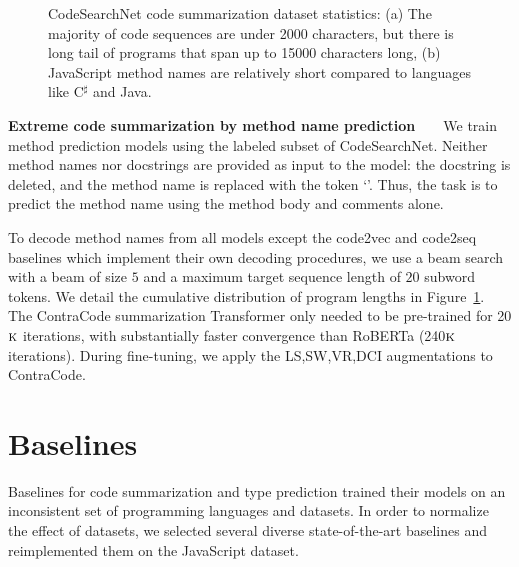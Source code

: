 \documentclass[11pt]{article}
\newcommand{\thou}[0]{$\textsc{k}$}
\newcommand{\ours}[0]{ContraCode}
\begin{document}
\begin{figure}[t!]
    \centering
    \qquad
    \caption{CodeSearchNet code summarization dataset statistics: (a) The majority of code sequences are under 2000 characters, but there is long tail of programs that span up to 15000 characters long, (b) JavaScript method names are relatively short compared to languages like C$^\sharp$ and Java.}
    \label{fig:dataset_statistics_identifier}
\end{figure} 
\textbf{Extreme code summarization by method name prediction}~~~~We train method prediction models using the labeled subset of CodeSearchNet. Neither method names nor docstrings are provided as input to the model: the docstring is deleted, and the method name is replaced with the token `'. Thus, the task is to predict the method name using the method body and comments alone.

To decode method names from all models except the code2vec and code2seq baselines which implement their own decoding procedures, we use a beam search with a beam of size $5$ and a maximum target sequence length of $20$ subword tokens. We detail the cumulative distribution of program lengths in Figure~\ref{fig:dataset_statistics_identifier}. The \ours{} summarization Transformer only needed to be pre-trained for 20\thou{} iterations, with substantially faster convergence than RoBERTa (240\thou{} iterations). During fine-tuning, we apply the LS,SW,VR,DCI augmentations to \ours{}.



\section{Baselines}
\label{sec:appendix:baseline_js}
Baselines for code summarization and type prediction trained their models on an inconsistent set of programming languages and datasets. In order to normalize the effect of datasets, we selected several diverse state-of-the-art baselines and reimplemented them on the JavaScript dataset.
\end{document}
